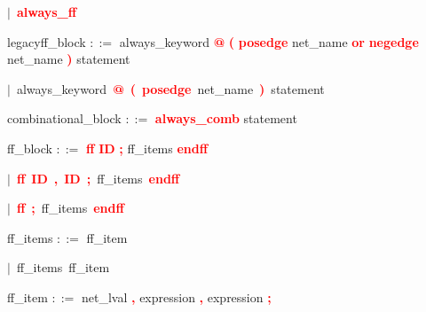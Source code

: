\mbox{$|$ \textbf{\textcolor{red}{always\_ff}}}

\vspace{1em}
\noindent
\settowidth{\parindent}{\hspace{4ex}}

\vspace{1em}
\noindent
\settowidth{\parindent}{\hspace{4ex}}
legacyff\_block $::=$\hspace{1ex} always\_keyword \textbf{\textcolor{red}{@}} \textbf{\textcolor{red}{(}} \textbf{\textcolor{red}{posedge}} net\_name \textbf{\textcolor{red}{or}} \textbf{\textcolor{red}{negedge}} net\_name \textbf{\textcolor{red}{)}} statement

\mbox{$|$ always\_keyword \textbf{\textcolor{red}{@}} \textbf{\textcolor{red}{(}} \textbf{\textcolor{red}{posedge}} net\_name \textbf{\textcolor{red}{)}} statement}

\vspace{1em}
\noindent
\settowidth{\parindent}{\hspace{4ex}}
combinational\_block $::=$\hspace{1ex} \textbf{\textcolor{red}{always\_comb}} statement

\vspace{1em}
\noindent
\settowidth{\parindent}{\hspace{4ex}}
ff\_block $::=$\hspace{1ex} \textbf{\textcolor{red}{ff}} \textbf{\textcolor{red}{ID}} \textbf{\textcolor{red}{;}} ff\_items \textbf{\textcolor{red}{endff}}

\mbox{$|$ \textbf{\textcolor{red}{ff}} \textbf{\textcolor{red}{ID}} \textbf{\textcolor{red}{,}} \textbf{\textcolor{red}{ID}} \textbf{\textcolor{red}{;}} ff\_items \textbf{\textcolor{red}{endff}}}

\mbox{$|$ \textbf{\textcolor{red}{ff}} \textbf{\textcolor{red}{;}} ff\_items \textbf{\textcolor{red}{endff}}}

\vspace{1em}
\noindent
\settowidth{\parindent}{\hspace{4ex}}
ff\_items $::=$\hspace{1ex} ff\_item

\mbox{$|$ ff\_items ff\_item}

\vspace{1em}
\noindent
\settowidth{\parindent}{\hspace{4ex}}
ff\_item $::=$\hspace{1ex} net\_lval \textbf{\textcolor{red}{,}} expression \textbf{\textcolor{red}{,}} expression \textbf{\textcolor{red}{;}}

